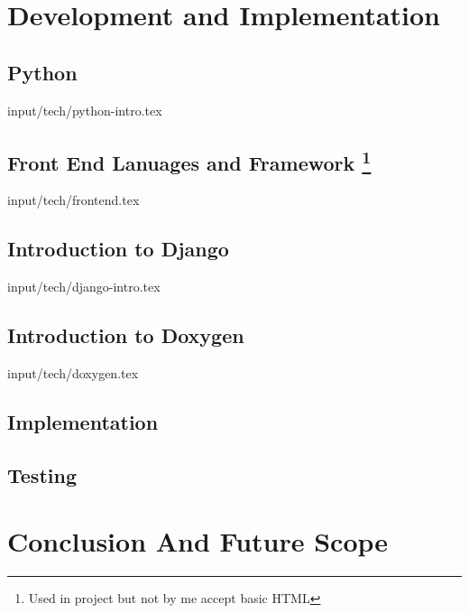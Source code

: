 \documentclass[12pt]{report}
\begin{document}
\newpage
\chapter{Development and Implementation}
\section{Python} 
 {input/tech/python-intro.tex}


\section[Front End Lanuages and Framework]{Front End Lanuages 
and Framework \footnote{ Used in project but not by me accept 
basic HTML}}
 {input/tech/frontend.tex}




\section{Introduction to Django}
 {input/tech/django-intro.tex}

\section{Introduction to Doxygen}
 {input/tech/doxygen.tex}






\section{Implementation}


\section{Testing}


\chapter{Conclusion And Future Scope}



\end{document}
